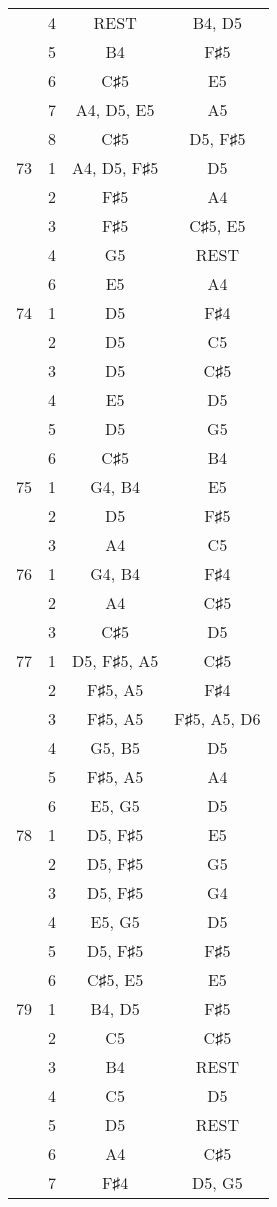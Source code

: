 \documentclass{article}
\begin{document}
\begin{longtable}{|c|c|c|c|}
  & 4 & REST & B4, D5 \\ 
  & 5 & B4 & F♯5 \\ 
  & 6 & C♯5 & E5 \\ 
  & 7 & A4, D5, E5 & A5 \\ 
  & 8 & C♯5 & D5, F♯5 \\ 
\hline
73 & 1 & A4, D5, F♯5 & D5 \\ 
  & 2 & F♯5 & A4 \\ 
  & 3 & F♯5 & C♯5, E5 \\ 
  & 4 & G5 & REST \\ 
  & 6 & E5 & A4 \\ 
\hline
74 & 1 & D5 & F♯4 \\ 
  & 2 & D5 & C5 \\ 
  & 3 & D5 & C♯5 \\ 
  & 4 & E5 & D5 \\ 
  & 5 & D5 & G5 \\ 
  & 6 & C♯5 & B4 \\ 
\hline
75 & 1 & G4, B4 & E5 \\ 
  & 2 & D5 & F♯5 \\ 
  & 3 & A4 & C5 \\ 
\hline
76 & 1 & G4, B4 & F♯4 \\ 
  & 2 & A4 & C♯5 \\ 
  & 3 & C♯5 & D5 \\ 
\hline
77 & 1 & D5, F♯5, A5 & C♯5 \\ 
  & 2 & F♯5, A5 & F♯4 \\ 
  & 3 & F♯5, A5 & F♯5, A5, D6 \\ 
  & 4 & G5, B5 & D5 \\ 
  & 5 & F♯5, A5 & A4 \\ 
  & 6 & E5, G5 & D5 \\ 
\hline
78 & 1 & D5, F♯5 & E5 \\ 
  & 2 & D5, F♯5 & G5 \\ 
  & 3 & D5, F♯5 & G4 \\ 
  & 4 & E5, G5 & D5 \\ 
  & 5 & D5, F♯5 & F♯5 \\ 
  & 6 & C♯5, E5 & E5 \\ 
\hline
79 & 1 & B4, D5 & F♯5 \\ 
  & 2 & C5 & C♯5 \\ 
  & 3 & B4 & REST \\ 
  & 4 & C5 & D5 \\ 
  & 5 & D5 & REST \\ 
  & 6 & A4 & C♯5 \\ 
  & 7 & F♯4 & D5, G5 \\ 

\end{longtable}
\end{document}
